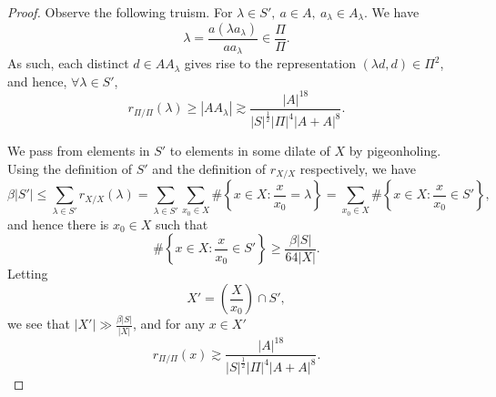 \documentclass[10pt,a4paper]{amsart}
\begin{document}
\begin{proof}
Observe the following truism. For \(\lambda \in S',~ a \in A,~ a_{\lambda} \in A_{\lambda} \). We have
\[
    \lambda = \frac{a \left( \lambda a_{\lambda}  \right) }{a a_{\lambda} } \in \frac{\Pi}{\Pi} 
.\]
As such, each distinct \(d \in A A_{\lambda} \) gives rise to the representation \((\lambda d, d) \in \Pi ^{2}\), and hence, \(\forall \lambda \in S '\),
\[
    r_{ \Pi / \Pi  } (\lambda) \geq \left\lvert A A_{\lambda}  \right\rvert \gtrsim \frac{\left\lvert A \right\rvert ^{18}}{\left\lvert S \right\rvert ^{\frac{1}{2} } \left\lvert \Pi \right\rvert ^{4} \left\lvert A + A \right\rvert ^{8}} 
.\]

We pass from elements in \(S'\) to elements in some dilate of \(X\) by pigeonholing.
Using the definition of \(S'\) and the definition of \(r_{X / X} \) respectively, we have
\[
    \beta \left\lvert S' \right\rvert \leq  \sum _{\lambda \in S'} r_{ X / X } (\lambda) = \sum _{\lambda \in S'} \sum _{x_0 \in X} \# \left\{ x \in X : \frac{x}{x_0} = \lambda \right\}   = \sum _{x_0 \in X} \# \left\{ x \in X : \frac{x}{x_0} \in S ' \right\}  
,\]
and hence there is \(x_0 \in X\) such that
\[
    \# \left\{ x \in X : \frac{x}{x_0} \in S'  \right\} \geq \frac{\beta \left\lvert S  \right\rvert }{64 \left\lvert X \right\rvert } 
.\]
Letting
\[
    X' = \left( \frac{X}{x_0}  \right) \cap S'
,\]
we see that \(\left\lvert X' \right\rvert \gg \frac{\beta \left\lvert S  \right\rvert }{\left\lvert X \right\rvert } \), and
for any \(x \in X'\)
\begin{equation} \label{eq:xprime-rep}
    r_{ \Pi / \Pi } \left( x  \right)  \gtrsim \frac{\left\lvert A \right\rvert ^{18}}{\left\lvert S \right\rvert ^{\frac{1}{2} } \left\lvert \Pi \right\rvert ^{4} \left\lvert A + A \right\rvert ^{8}}.
\end{equation}  


\end{proof}
\end{document}
